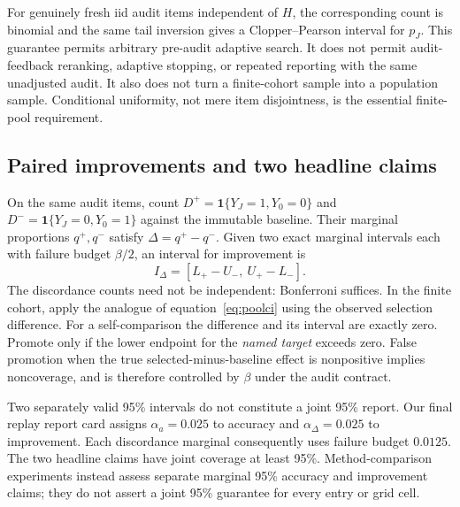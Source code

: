 \documentclass{article}
\newcommand{\ind}{\mathbf 1}
\begin{document}
For genuinely fresh iid audit items independent of $H$, the corresponding count is binomial and the same tail inversion gives a Clopper--Pearson interval for $p_J$. This guarantee permits arbitrary pre-audit adaptive search. It does not permit audit-feedback reranking, adaptive stopping, or repeated reporting with the same unadjusted audit. It also does not turn a finite-cohort sample into a population sample. Conditional uniformity, not mere item disjointness, is the essential finite-pool requirement.

\subsection{Paired improvements and two headline claims}
On the same audit items, count $D^+=\ind\{Y_J=1,Y_0=0\}$ and $D^-=\ind\{Y_J=0,Y_0=1\}$ against the immutable baseline. Their marginal proportions $q^+,q^-$ satisfy $\Delta=q^+-q^-$. Given two exact marginal intervals each with failure budget $\beta/2$, an interval for improvement is
\begin{equation}
 I_\Delta=[L_+-U_-,\ U_+-L_-].\label{eq:pair}
\end{equation}
The discordance counts need not be independent: Bonferroni suffices. In the finite cohort, apply the analogue of equation~\eqref{eq:poolci} using the observed selection difference. For a self-comparison the difference and its interval are exactly zero. Promote only if the lower endpoint for the \emph{named target} exceeds zero. False promotion when the true selected-minus-baseline effect is nonpositive implies noncoverage, and is therefore controlled by $\beta$ under the audit contract.

Two separately valid 95\% intervals do not constitute a joint 95\% report. Our final replay report card assigns $\alpha_a=0.025$ to accuracy and $\alpha_\Delta=0.025$ to improvement. Each discordance marginal consequently uses failure budget $0.0125$. The two headline claims have joint coverage at least 95\%. Method-comparison experiments instead assess separate marginal 95\% accuracy and improvement claims; they do not assert a joint 95\% guarantee for every entry or grid cell.
\end{document}
